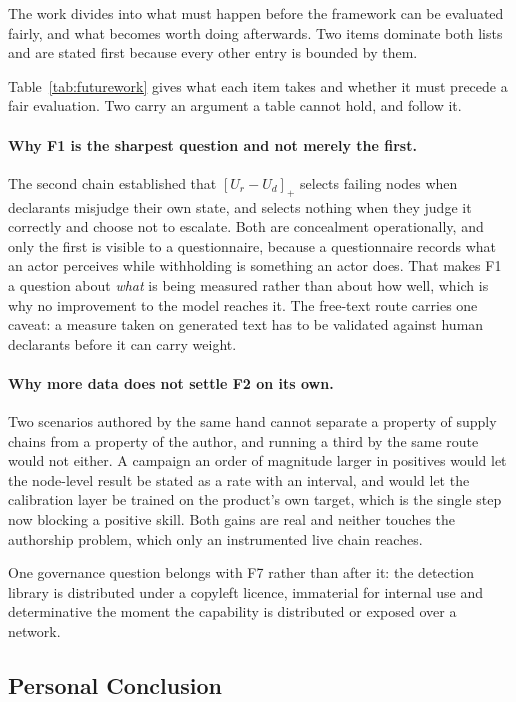 The work divides into what must happen before the framework can be evaluated fairly, and
what becomes worth doing afterwards. Two items dominate both lists and are stated first
because every other entry is bounded by them.

Table~\ref{tab:futurework} gives what each item takes and whether it must precede a fair
evaluation. Two carry an argument
a table cannot hold, and follow it.

\paragraph{Why F1 is the sharpest question and not merely the first.}
The second chain established that $[U_r - U_d]_+$ selects failing nodes when declarants
misjudge their own state, and selects nothing when they judge it correctly and choose not to
escalate. Both are concealment operationally, and only the first is visible to a
questionnaire, because a questionnaire records what an actor perceives while withholding is
something an actor does. That makes F1 a question about \emph{what} is being measured rather
than about how well, which is why no improvement to the model reaches it. The free-text route
carries one caveat: a measure taken on generated text has to be validated against human
declarants before it can carry weight.

\paragraph{Why more data does not settle F2 on its own.}
Two scenarios authored by the same hand cannot separate a property of supply chains from a
property of the author, and running a third by the same route would not either. A campaign an
order of magnitude larger in positives would let the node-level result be stated as a rate
with an interval, and would let the calibration layer be trained on the product's own target,
which is the single step now blocking a positive skill. Both gains are real and neither
touches the authorship problem, which only an instrumented live chain reaches.

One governance question belongs with F7 rather than after it: the detection library is
distributed under a copyleft licence, immaterial for internal use and determinative the moment
the capability is distributed or exposed over a network.

\subsection{Personal Conclusion}
\label{sec:personal}

